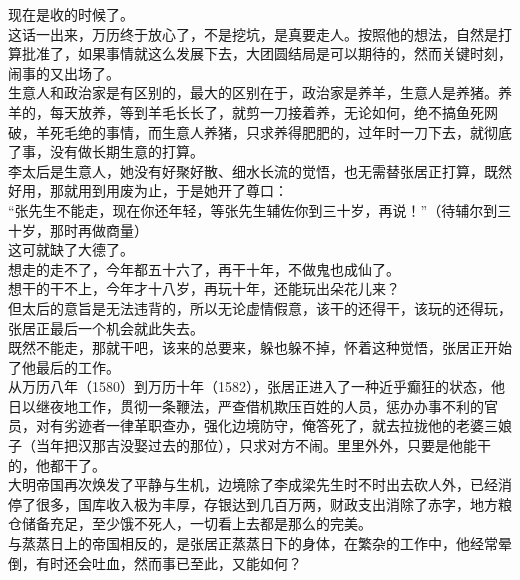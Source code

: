 \begin{multicols}{\theparacolNo}
现在是收的时候了。\\

这话一出来，万历终于放心了，不是挖坑，是真要走人。按照他的想法，自然是打算批准了，如果事情就这么发展下去，大团圆结局是可以期待的，然而关键时刻，闹事的又出场了。\\

生意人和政治家是有区别的，最大的区别在于，政治家是养羊，生意人是养猪。养羊的，每天放养，等到羊毛长长了，就剪一刀接着养，无论如何，绝不搞鱼死网破，羊死毛绝的事情，而生意人养猪，只求养得肥肥的，过年时一刀下去，就彻底了事，没有做长期生意的打算。\\

李太后是生意人，她没有好聚好散、细水长流的觉悟，也无需替张居正打算，既然好用，那就用到用废为止，于是她开了尊口：\\

“张先生不能走，现在你还年轻，等张先生辅佐你到三十岁，再说！”（待辅尔到三十岁，那时再做商量）\\

这可就缺了大德了。\\

想走的走不了，今年都五十六了，再干十年，不做鬼也成仙了。\\

想干的干不上，今年才十八岁，再玩十年，还能玩出朵花儿来？\\

但太后的意旨是无法违背的，所以无论虚情假意，该干的还得干，该玩的还得玩，张居正最后一个机会就此失去。\\

既然不能走，那就干吧，该来的总要来，躲也躲不掉，怀着这种觉悟，张居正开始了他最后的工作。\\

从万历八年（1580）到万历十年（1582），张居正进入了一种近乎癫狂的状态，他日以继夜地工作，贯彻一条鞭法，严查借机欺压百姓的人员，惩办办事不利的官员，对有劣迹者一律革职查办，强化边境防守，俺答死了，就去拉拢他的老婆三娘子（当年把汉那吉没娶过去的那位），只求对方不闹。里里外外，只要是他能干的，他都干了。\\

大明帝国再次焕发了平静与生机，边境除了李成梁先生时不时出去砍人外，已经消停了很多，国库收入极为丰厚，存银达到几百万两，财政支出消除了赤字，地方粮仓储备充足，至少饿不死人，一切看上去都是那么的完美。\\

与蒸蒸日上的帝国相反的，是张居正蒸蒸日下的身体，在繁杂的工作中，他经常晕倒，有时还会吐血，然而事已至此，又能如何？\\


\end{multicols}
